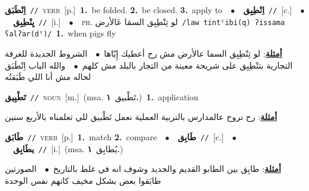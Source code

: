 \documentclass[10pt,a4paper,twoside]{article} %
\begin{document}
\begin{multicols}{2}
{\setlength\topsep{0pt}\textbf{\foreignlanguage{arabic}{اِنْطَبَق}}\ {\color{gray}\texttt{//}\color{black}}\ \textsc{verb}\ [p.]\ \textbf{1.}~be folded.  \textbf{2.}~be closed.  \textbf{3.}~apply to\ \ $\bullet$\ \ \setlength\topsep{0pt}\textbf{\foreignlanguage{arabic}{اِنْطِبِق}}\ {\color{gray}\texttt{//}\color{black}}\ [c.]\ \ $\bullet$\ \ \setlength\topsep{0pt}\textbf{\foreignlanguage{arabic}{يِنْطِبِق}}\ {\color{gray}\texttt{//}\color{black}}\ [i.]\ \ $\bullet$\ \ \textsc{ph.} \color{gray} \foreignlanguage{arabic}{لو تِنْطِبِق السمَا عَالأرض}\color{black}\ {\color{gray}\texttt{/{\sffamily law tintˤibi(q) ʔissama ʕalʔar(dˤ)}/}\color{black}}\ \textbf{1.}~when pigs fly\  \begin{flushright}\color{gray}\foreignlanguage{arabic}{\textbf{\underline{\foreignlanguage{arabic}{أمثلة}}}: لو تِنْطِبِق السما عالأرض مش رح أعطيك إِيّاها\ $\bullet$\ \  الشروط الجديدة للغرفة التجارية بتنْطِبِق على شريحة معينة من التجار بالبلد مش كلهم\ $\bullet$\ \  والله الباب اِنْطَبَق لحاله مش أنا اللي طَبَقتُه}\end{flushright}\color{black}} \vspace{2mm}

{\setlength\topsep{0pt}\textbf{\foreignlanguage{arabic}{تَطْبِيق}}\ {\color{gray}\texttt{//}\color{black}}\ \textsc{noun}\ [m.]\ \color{gray}(msa. \foreignlanguage{arabic}{تَطْبيق}~\foreignlanguage{arabic}{\textbf{١.}})\color{black}\ \textbf{1.}~application\  \begin{flushright}\color{gray}\foreignlanguage{arabic}{\textbf{\underline{\foreignlanguage{arabic}{أمثلة}}}: رح نروح عالمدارس بالتربية العملية نعمل تَطْبيق للي تعلمناه بالأربع سنين}\end{flushright}\color{black}} \vspace{2mm}

{\setlength\topsep{0pt}\textbf{\foreignlanguage{arabic}{طَابَق}}\ {\color{gray}\texttt{//}\color{black}}\ \textsc{verb}\ [p.]\ \textbf{1.}~match  \textbf{2.}~compare\ \ $\bullet$\ \ \setlength\topsep{0pt}\textbf{\foreignlanguage{arabic}{طَابِق}}\ {\color{gray}\texttt{//}\color{black}}\ [c.]\ \ $\bullet$\ \ \setlength\topsep{0pt}\textbf{\foreignlanguage{arabic}{يطَابِق}}\ {\color{gray}\texttt{//}\color{black}}\ [i.]\ \color{gray}(msa. \foreignlanguage{arabic}{يُطابِق}~\foreignlanguage{arabic}{\textbf{١.}})\color{black}\  \begin{flushright}\color{gray}\foreignlanguage{arabic}{\textbf{\underline{\foreignlanguage{arabic}{أمثلة}}}: طابِق بين الطابو القديم والجديد وشوف انه في غلط بالتاريخ\ $\bullet$\ \  الصورتين طابَقوا بعض بشكل مخيف كانهم نفس الوحدة}\end{flushright}\color{black}} \vspace{2mm}


\end{multicols}
\end{document}
